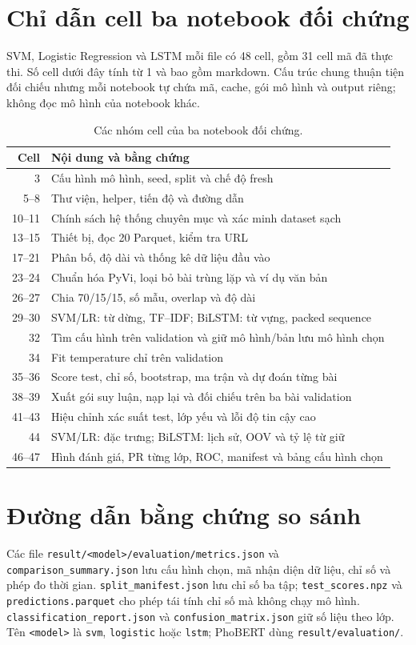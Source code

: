 \section{Chỉ dẫn cell ba notebook đối chứng}
SVM, Logistic Regression và LSTM mỗi file có 48 cell, gồm 31 cell mã đã thực thi. Số cell dưới đây tính từ 1 và bao gồm markdown. Cấu trúc chung thuận tiện đối chiếu nhưng mỗi notebook tự chứa mã, cache, gói mô hình và output riêng; không đọc mô hình của notebook khác.
\begin{table}[H]\centering\small\caption{Các nhóm cell của ba notebook đối chứng.}
\begin{tabular}{r p{112mm}}\toprule Cell & Nội dung và bằng chứng\\\midrule
3 & Cấu hình mô hình, seed, split và chế độ fresh\\
5--8 & Thư viện, helper, tiến độ và đường dẫn\\
10--11 & Chính sách hệ thống chuyên mục và xác minh dataset sạch\\
13--15 & Thiết bị, đọc 20 Parquet, kiểm tra URL\\
17--21 & Phân bố, độ dài và thống kê dữ liệu đầu vào\\
23--24 & Chuẩn hóa PyVi, loại bỏ bài trùng lặp và ví dụ văn bản\\
26--27 & Chia 70/15/15, số mẫu, overlap và độ dài\\
29--30 & SVM/LR: từ dừng, TF--IDF; BiLSTM: từ vựng, packed sequence\\
32 & Tìm cấu hình trên validation và giữ mô hình/bản lưu mô hình chọn\\
34 & Fit temperature chỉ trên validation\\
35--36 & Score test, chỉ số, bootstrap, ma trận và dự đoán từng bài\\
38--39 & Xuất gói suy luận, nạp lại và đối chiếu trên ba bài validation\\
41--43 & Hiệu chỉnh xác suất test, lớp yếu và lỗi độ tin cậy cao\\
44 & SVM/LR: đặc trưng; BiLSTM: lịch sử, OOV và tỷ lệ từ giữ\\
46--47 & Hình đánh giá, PR từng lớp, ROC, manifest và bảng cấu hình chọn\\\bottomrule
\end{tabular}\end{table}

\section{Đường dẫn bằng chứng so sánh}
Các file \texttt{result/<model>/evaluation/metrics.json} và \texttt{comparison\_summary.json} lưu cấu hình chọn, mã nhận diện dữ liệu, chỉ số và phép đo thời gian. \texttt{split\_manifest.json} lưu chỉ số ba tập; \texttt{test\_scores.npz} và \texttt{predictions.parquet} cho phép tái tính chỉ số mà không chạy mô hình. \texttt{classification\_report.json} và \texttt{confusion\_matrix.json} giữ số liệu theo lớp. Tên \texttt{<model>} là \texttt{svm}, \texttt{logistic} hoặc \texttt{lstm}; PhoBERT dùng \texttt{result/evaluation/}.

